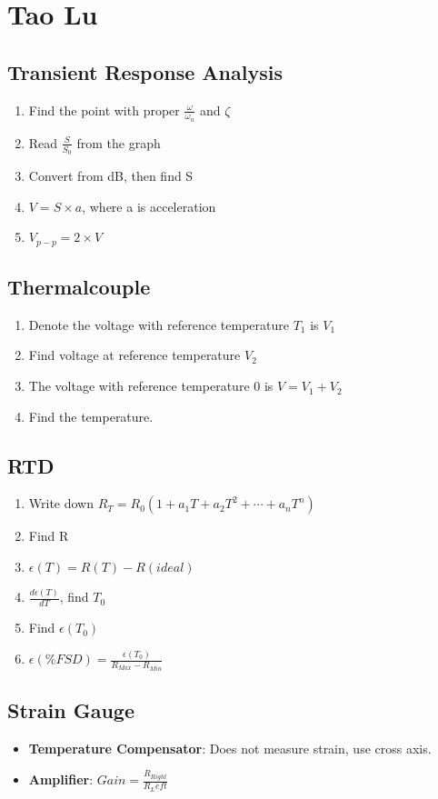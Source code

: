 \documentclass{article}
\begin{document}
\section{Tao Lu}
  \subsection{Transient Response Analysis}
  \begin{enumerate}
   \item Find the point with proper $\frac{\omega}{\omega_n}$ and $\zeta$
   \item Read $\frac{S}{S_0}$ from the graph
   \item Convert from dB, then find S
   \item $V = S \times a$, where a is acceleration
   \item $V_{p-p} = 2\times V$
  \end{enumerate}  
  
  \subsection{Thermalcouple}
\begin{enumerate}
\item Denote the voltage with reference temperature $T_1$ is $V_1$
\item Find voltage at reference temperature $V_2$
\item The voltage with reference temperature 0 is $V = V_1 + V_2$
\item Find the temperature.
\end{enumerate}  
  
  \subsection{RTD}
  \begin{enumerate}
    \item Write down $R_T = R_0(1+a_1T + a_2T^2 + \cdots + a_nT^n)$
    \item Find R
    \item $\epsilon(T) = R(T) - R(ideal)$
    \item $\frac{d\epsilon (T)}{dT}$, find $T_0$
    \item Find $\epsilon (T_0)$
    \item $\epsilon(\% FSD) = \frac{\epsilon (T_0)}{R_{Max} - R_{Min}}$
  \end{enumerate}
  
  \subsection{Strain Gauge}
  \begin{itemize}
  \item \textbf{Temperature Compensator}: Does not measure strain, use cross axis.
  \item \textbf{Amplifier}: $Gain = \frac{R_{Right}}{R_Left}$
  \end{itemize}
  
\end{document}
